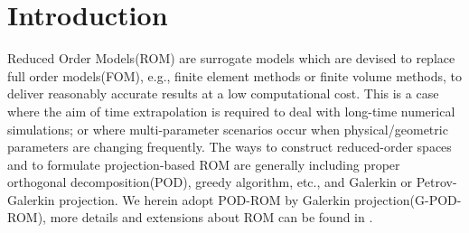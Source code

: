 \documentclass[10pt,twoside,openany,UTF8,CJK]{article}
\begin{document}
	\section{Introduction}
	\noindent Reduced Order Models(ROM) are surrogate models which are devised to replace full order models(FOM), e.g., finite element methods or finite volume methods, to deliver reasonably accurate results at a low computational cost. This is a case where the aim of time extrapolation is required to deal with long-time numerical simulations; or where multi-parameter scenarios occur when physical/geometric parameters are changing frequently. The ways to construct reduced-order spaces and to formulate projection-based ROM are generally including proper orthogonal decomposition(POD), greedy algorithm, etc., and Galerkin or Petrov-Galerkin projection. We herein adopt POD-ROM by Galerkin projection(G-POD-ROM), more details and extensions about ROM can be found in \cite{RBM-BOOK-1, RBM-BOOK-2}.  \\
\end{document}
